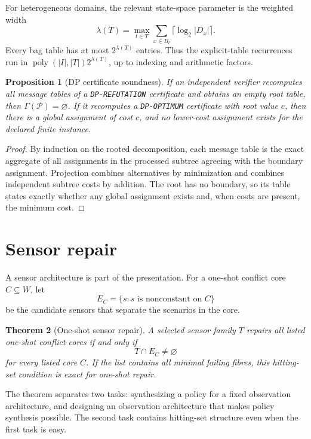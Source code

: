 \documentclass[11pt]{article}
\theoremstyle{plain}
\newtheorem{theorem}{Theorem}[section]
\newtheorem{proposition}[theorem]{Proposition}
\theoremstyle{definition}
\theoremstyle{remark}
\begin{document}
For heterogeneous domains, the relevant state-space parameter is the weighted
width
\[
  \lambda(T)=\max_{t\in T}\sum_{x\in B_t}\lceil\log_2|D_x|\rceil.
\]
Every bag table has at most \(2^{\lambda(T)}\) entries.  Thus the explicit-table
recurrences run in \(\operatorname{poly}(|I|,|T|)2^{\lambda(T)}\), up to
indexing and arithmetic factors.

\begin{proposition}[DP certificate soundness]
If an independent verifier recomputes all message tables of a
\texttt{DP-REFUTATION} certificate and obtains an empty root table, then
\(\Gamma(\mathcal P)=\varnothing\).  If it recomputes a \texttt{DP-OPTIMUM}
certificate with root value \(c\), then there is a global assignment of cost
\(c\), and no lower-cost assignment exists for the declared finite instance.
\end{proposition}

\begin{proof}
By induction on the rooted decomposition, each message table is the exact
aggregate of all assignments in the processed subtree agreeing with the boundary
assignment.  Projection combines alternatives by minimization and combines
independent subtree costs by addition.  The root has no boundary, so its table
states exactly whether any global assignment exists and, when costs are present,
the minimum cost.
\end{proof}

\section{Sensor repair}
\label{sec:sensor-repair}

A sensor architecture is part of the presentation.  For a one-shot conflict core
\(C\subseteq W\), let
\[
  E_C=\{s:s\text{ is nonconstant on }C\}
\]
be the candidate sensors that separate the scenarios in the core.

\begin{theorem}[One-shot sensor repair]
A selected sensor family \(T\) repairs all listed one-shot conflict cores if and
only if
\[
  T\cap E_C\ne\varnothing
\]
for every listed core \(C\).  If the list contains all minimal failing fibres,
this hitting-set condition is exact for one-shot repair.
\end{theorem}

The theorem separates two tasks: synthesizing a policy for a fixed observation
architecture, and designing an observation architecture that makes policy
synthesis possible.  The second task contains hitting-set structure even when
the first task is easy.
\end{document}
